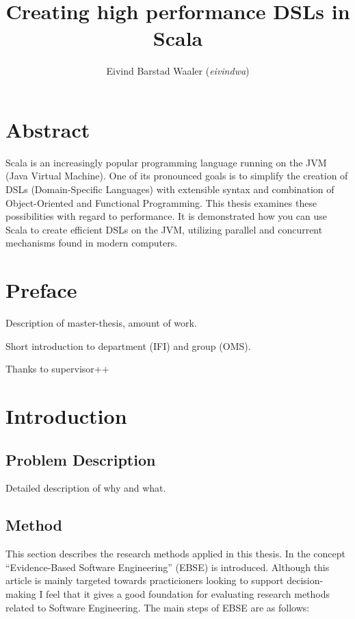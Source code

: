 \documentclass[a4paper,english]{report}
\title{Creating high performance DSLs in Scala}
\author{Eivind Barstad Waaler (\emph{eivindwa})}
\begin{document}
\uiosloforside[kind={Master thesis},boxcolor=matnat,textcolor=white]

\chapter{Abstract}

Scala is an increasingly popular programming language running on the
JVM (Java Virtual Machine). One of its pronounced goals is to simplify
the creation of DSLs (Domain-Specific Languages) with extensible
syntax and combination of Object-Oriented and Functional
Programming. This thesis examines these possibilities with regard to
performance. It is demonstrated how you can use Scala to create
efficient DSLs on the JVM, utilizing parallel and concurrent
mechanisms found in modern computers.

\tableofcontents

\listoftables

\listoffigures

\chapter{Preface}

Description of master-thesis, amount of work.

Short introduction to department (IFI) and group (OMS).

Thanks to supervisor++

\chapter{Introduction}

\section{Problem Description}

Detailed description of why and what. 

\section{Method}

This section describes the research methods applied in this thesis. In
\cite{dyb08} the concept ``Evidence-Based Software Engineering'' (EBSE)
is introduced. Although this article is mainly targeted towards
practicioners looking to support decision-making I feel that it gives
a good foundation for evaluating research methods related to Software
Engineering. The main steps of EBSE are as follows:
\end{document}
